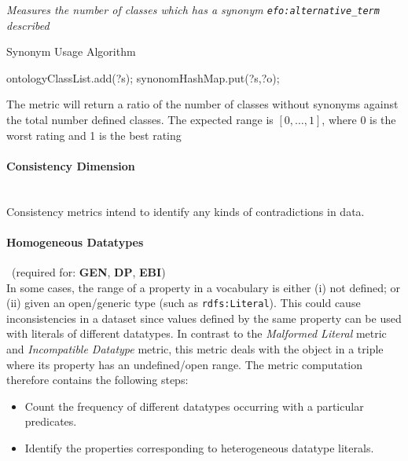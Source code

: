 \begin{mdframed}[style=metricdefinition]
\emph{Measures the number of classes which has a synonym \texttt{efo:alternative\_term} described}
\end{mdframed}

\begin{algorithm}
\caption{Synonym Usage Algorithm}
\begin{algorithmic}[1]
 ontologyClassList.add(?s); \EndIf
{} 
\State synonomHashMap.put(?s,?o);
\EndIf
\EndProcedure
\end{algorithmic}
\end{algorithm}

The metric will return a ratio of the number of classes without synonyms against the total number defined classes. The expected range is $[0,\ldots,1]$, where 0 is the worst rating and 1 is the best rating

\paragraph{Consistency Dimension}~\\ 
Consistency metrics intend to identify any kinds of contradictions in data.
\paragraph{Homogeneous Datatypes}~(required for: \textbf{GEN}, \textbf{DP}, \textbf{EBI})~\\
In some cases, the range of a property in a vocabulary is either (i) not defined; or (ii) given an open/generic type (such as \texttt{rdfs:Literal}).
This could cause inconsistencies in a dataset since values defined by the same property can be used with literals of different datatypes.
In contrast to the \emph{Malformed Literal} metric and \emph{Incompatible Datatype} metric, this metric deals  with the object in a triple where its property has an undefined/open range. 
The metric computation therefore contains the following steps:
\begin{itemize}
\item Count the frequency of different datatypes occurring with a particular predicates.
\item Identify the properties corresponding to heterogeneous datatype literals.
\end{itemize}

